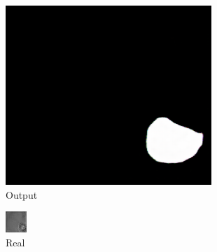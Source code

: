 \begin{figure}
\begin{subfigure}{.19\textwidth}
		\includegraphics[width=.9\linewidth]{img/results/min_output}
		\caption{Output}
	\end{subfigure}
	\begin{subfigure}{.19\textwidth}
		\centering
		\includegraphics[width=.9\linewidth,interpolate=false]{img/results/min_real}
		\caption{Real}
	\end{subfigure}
	\begin{subfigure}{.19\textwidth}
		\centering

\end{subfigure}
\end{figure}
